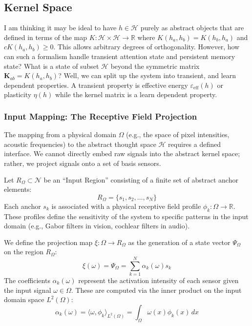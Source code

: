 \documentclass{article}
\begin{document}
\subsection{Kernel Space}
I am thinking it may be ideal to have $h \in \mathcal{H}$ purely as abstract objects that are defined in terms of the map $K : \mathcal{H} \times \mathcal{H} \to \mathbb{R}$ where $K(h_a, h_b) = K(h_b, h_a)$ and $cK(h_a, h_b) \ge 0$. This allows arbitrary degrees of orthogonality. However, how can such a formalism handle transient attention state and persistent memory state? What is a state of subset $\mathcal{H}$ beyond the symmetric matrix $\mathbf{K}_{ab} = K(h_a,h_b)$? Well, we can split up the system into transient, and learn dependent properties. A transient property is effective energy $\varepsilon_{\text{eff}}(h)$ or plasticity $\eta(h)$ while the kernel matrix is a learn dependent property.

\subsubsection{Input Mapping: The Receptive Field Projection}
The mapping from a physical domain $\Omega$ (e.g., the space of pixel intensities, acoustic frequencies) to the abstract thought space $\mathcal{H}$ requires a defined interface. We cannot directly embed raw signals into the abstract kernel space; rather, we project signals onto a set of basis sensors.

Let $R_\Omega \subset \mathcal{N}$ be an ``Input Region'' consisting of a finite set of abstract anchor elements:
\begin{equation}
    R_\Omega = \{ s_1, s_2, \dots, s_N \}
\end{equation}
Each anchor $s_k$ is associated with a physical receptive field profile $\phi_k : \Omega \to \mathbb{R}$. These profiles define the sensitivity of the system to specific patterns in the input domain (e.g., Gabor filters in vision, cochlear filters in audio).

We define the projection map $\xi : \Omega \to R_\Omega$ as the generation of a state vector $\Psi_\Omega$ on the region $R_\Omega$:
\begin{equation}
    \xi(\omega) = \Psi_\Omega = \sum_{k=1}^{N} \alpha_k(\omega) s_k
\end{equation}
The coefficients $\alpha_k(\omega)$ represent the activation intensity of each sensor given the input signal $\omega \in \Omega$. These are computed via the inner product on the input domain space $L^2(\Omega)$:
\begin{equation}
    \alpha_k(\omega) = \langle \omega, \phi_k \rangle_{L^2(\Omega)} = \int_{\Omega} \omega(x) \phi_k(x) \, dx
\end{equation}
\end{document}
